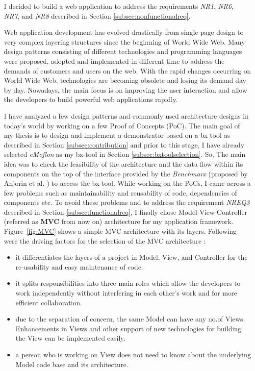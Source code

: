 I decided to build a web application to address the requirements \textit{NR1}, \textit{NR6}, \textit{NR7}, and \textit{NR8} described in Section \ref{subsec:nonfunctionalreq}.

Web application development has evolved drastically from single page design to very complex layering structures since the beginning of World Wide Web. Many design patterns \cite{designpattern} \cite{designpattern-notes} consisting of different technologies and programming languages were proposed, adopted and implemented in different time to address the demands of customers and users on the web. With the rapid changes occurring on World Wide Web, technologies are becoming obsolete and losing its demand day by day. Nowadays, the main focus is on improving the user interaction and allow the developers to build powerful web applications rapidly.

I have analyzed a few design patterns and commonly used architecture designs in today's world by working on a few Proof of Concepts (PoC). The main goal of my thesis is to design and implement a demonstrator based on a bx-tool as described in Section \ref{subsec:contribution} and prior to this stage, I have already selected \textit{eMoflon} as my bx-tool in Section \ref{subsec:bxtoolselection}. So, The main idea was to check the feasibility of the architecture and the data flow within its components on the top of the interface provided by the \textit{Benchmarx} (proposed by Anjorin et al. \cite{benchmarx-reload}) to access the bx-tool. While working on the PoCs, I came across a few problems such as maintainability and reusability of code, dependencies of components etc. To avoid these problems and to address the requirement \textit{NREQ3} described in Section \ref{subsec:functionalreq}, I finally chose Model-View-Controller (referred as \textbf{MVC} from now on) architecture for my application framework. Figure~\ref{fig:MVC} shows a simple MVC architecture with its layers. Following were the driving factors for the selection of the MVC architecture \cite{designpattern-notes} \cite{designpattern-headfirst}:
\begin{itemize}
	\item {it differentiates the layers of a project in Model, View, and Controller for the re-usability and easy maintenance of code.}
	\item {it splits responsibilities into three main roles which allow the developers to work independently without interfering in each other's work and for more efficient collaboration.}
	\item {due to the separation of concern, the same Model can have any no.of Views. Enhancements in Views and other support of new technologies for building the View can be implemented easily.}
	\item {a person who is working on View does not need to know about the underlying Model code base and its architecture.}
\end{itemize}


